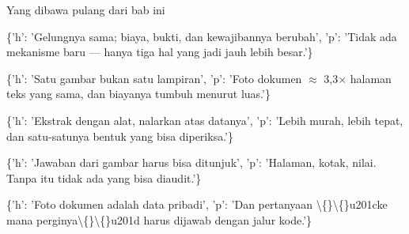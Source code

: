 \documentclass[aspectratio=169,11pt,t]{beamer}
\begin{document}
\begin{frame}[shrink=25]{Yang dibawa pulang dari bab ini}
\begin{isteps}
\item \{'h': 'Gelungnya sama; biaya, bukti, dan kewajibannya berubah', 'p': 'Tidak ada mekanisme baru --- hanya tiga hal yang jadi jauh lebih besar.'\}
\item \{'h': 'Satu gambar bukan satu lampiran', 'p': 'Foto dokumen $\approx$ 3,3$\times$ halaman teks yang sama, dan biayanya tumbuh menurut luas.'\}
\item \{'h': 'Ekstrak dengan alat, nalarkan atas datanya', 'p': 'Lebih murah, lebih tepat, dan satu-satunya bentuk yang bisa diperiksa.'\}
\item \{'h': 'Jawaban dari gambar harus bisa ditunjuk', 'p': 'Halaman, kotak, nilai. Tanpa itu tidak ada yang bisa diaudit.'\}
\item \{'h': 'Foto dokumen adalah data pribadi', 'p': 'Dan pertanyaan \textbackslash\{\}\textbackslash\{\}u201cke mana perginya\textbackslash\{\}\textbackslash\{\}u201d harus dijawab dengan jalur kode.'\}
\end{isteps}
\end{frame}
\end{document}
